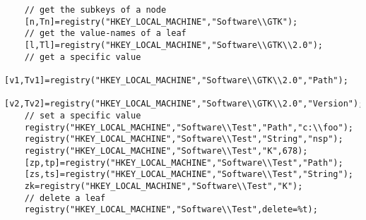 \begin{examples}
  \begin{Verbatim} 
    // get the subkeys of a node 
    [n,Tn]=registry("HKEY_LOCAL_MACHINE","Software\\GTK");
    // get the value-names of a leaf 
    [l,Tl]=registry("HKEY_LOCAL_MACHINE","Software\\GTK\\2.0");
    // get a specific value 
    [v1,Tv1]=registry("HKEY_LOCAL_MACHINE","Software\\GTK\\2.0","Path");
    [v2,Tv2]=registry("HKEY_LOCAL_MACHINE","Software\\GTK\\2.0","Version");
    // set a specific value 
    registry("HKEY_LOCAL_MACHINE","Software\\Test","Path","c:\\foo");
    registry("HKEY_LOCAL_MACHINE","Software\\Test","String","nsp");
    registry("HKEY_LOCAL_MACHINE","Software\\Test","K",678);
    [zp,tp]=registry("HKEY_LOCAL_MACHINE","Software\\Test","Path");
    [zs,ts]=registry("HKEY_LOCAL_MACHINE","Software\\Test","String");
    zk=registry("HKEY_LOCAL_MACHINE","Software\\Test","K");
    // delete a leaf 
    registry("HKEY_LOCAL_MACHINE","Software\\Test",delete=%t);
  \end{Verbatim}
\end{examples}


